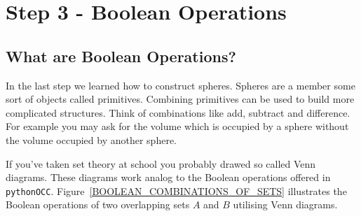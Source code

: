 \section{Step 3 - Boolean Operations}
\subsection{What are Boolean Operations?}
In the last step we learned how to construct spheres.
Spheres are a member some sort of objects called primitives.
Combining primitives can be used to build more complicated structures.
Think of combinations like add, subtract and difference.
For example you may ask for the volume which is occupied by a sphere without the volume occupied by another sphere.

If you've taken set theory at school you probably drawed so called Venn diagrams.
These diagrams work analog to the Boolean operations offered in {\tt pythonOCC}.
Figure~\ref{BOOLEAN_COMBINATIONS_OF_SETS} illustrates the Boolean operations of two overlapping sets $A$ and $B$ utilising Venn diagrams.

